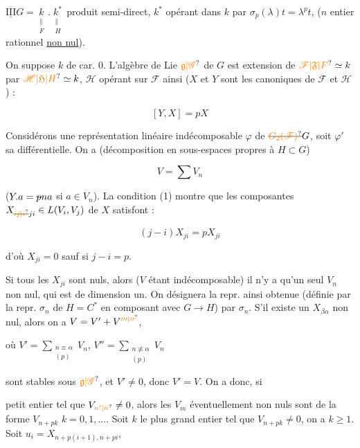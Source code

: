 $\underline{\overline{\mathrm{III}}}$\quad $G=\underset{\substack{\parallel\\F}}{k}\mathbin{.}\underset{\substack{\parallel\\H}}{k^*}$ produit semi-direct, $k^*$ opérant dans $k$ par $\sigma_p(\lambda)t=\lambda^pt$, ($n$ entier rationnel \uline{non nul}).

On suppose $k$ de car. 0. L'algèbre de Lie  $\unsure{\mathfrak g|\mathscr G}$ de $G$ est extension de $\unsure{\mathscr F|\mathfrak F|F}\simeq k$ par $\unsure{\mathscr H|\mathfrak H|H}\simeq k$, $\mathscr H$ opérant sur $\mathscr F$  ainsi ($X$ et $Y$ sont les  canoniques de $\mathscr F$ et $\mathscr H$) :

\[[Y,X]=pX\tag*{(1)}\]

Considérons une représentation linéaire indécomposable  $\varphi$ de $\deleted{\unsure{G_2(\mathscr F)}}G$, soit $\varphi'$ sa différentielle. On a (décomposition en sous-espaces propres  à $H\subset G$)

\[V=\sum V_n\]

($Y.a=\deleted{p}na$ si $a\in V_n$). La condition (1) montre que les composantes $X_{\deleted{\unsure{ij|i}}ji}\in L(V_i,V_j)$ de $X$ satisfont :

\[(j-i)X_{ji}=pX_{ji}\]

d'où $X_{ji}=0$ sauf si $j-i=p$.



Si tous les $X_{ji}$ sont nuls, alors ($V$ étant indécomposable) il n'y a qu'un seul $V_n$ non nul, qui est de dimension un. On désignera la repr. ainsi obtenue (définie par la repr. $\sigma_n$ de $H=C^*$ en composant avec $G\longrightarrow H$) par \uline{$\sigma_n$}. S'il existe un $X_{\beta\alpha}$ non nul, alors  on a $V=V'+V^{\unsure{\prime\prime\prime|\prime\prime}}$,

où $V'=\sum_{\substack{n\equiv\alpha\\(p)}}V_n$, $V''=\sum_{\substack{n\not\equiv\alpha\\(p)}}V_n$

sont stables sous $\unsure{\mathfrak g|\mathscr G}$, et $V'\ne0$, donc $V'=V$.  On a donc, si  

 petit entier tel que $V_{\unsure{n'|n}}\ne0$, alors les $V_m$ éventuellement non nuls  sont de la forme $V_{n+pk}$ $k=0,1,\ldots$. Soit $k$ le plus grand entier tel que $V_{n+pk}\ne0$,  on a $k\geq1$. Soit $u_i=X_{n+p(i+1),n+pi}$,

